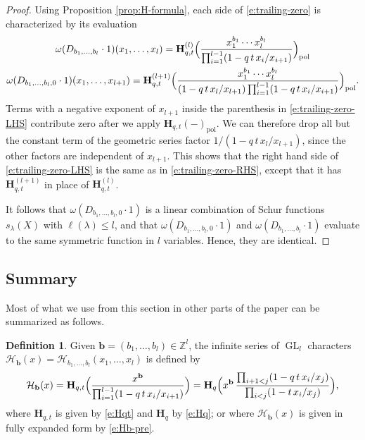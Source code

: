 \documentclass[12pt]{amsart}
\theoremstyle{definition}
\newtheorem{defn}[thm]{Definition}
\theoremstyle{remark}
\newcommand{\ZZ}{{\mathbb Z}}
\newcommand{\bb}{{\mathbf b}}
\newcommand{\Hbold}{{\mathbf H}}
\newcommand{\Hcat}{{\mathcal H}}  %
\DeclareMathOperator{\pol}{pol}
\DeclareMathOperator{\GL}{GL}
\begin{document}
\begin{proof}
Using Proposition \ref{prop:H-formula}, each side of
\eqref{e:trailing-zero} is characterized by its evaluation
\begin{gather}\label{e:trailing-zero-RHS}
\omega (D_{b_{1},\ldots,b_{l}} \cdot 1)(x_{1},\ldots,x_{l}) = \Hbold
^{(l)}_{q,t}\Bigl(\frac{x_{1}^{b_{1}}\cdots x_{l}^{b_{l}}}{\prod
_{i=1}^{l-1}(1 - q\, t\, x_{i}/x_{i+1})}\Bigr)_{\pol }\\
\label{e:trailing-zero-LHS}
\omega (D_{b_{1},\ldots,b_{l},0} \cdot 1)(x_{1},\ldots,x_{l+1}) =
\Hbold ^{(l+1)}_{q,t}\Bigl(\frac{x_{1}^{b_{1}}\cdots x_{l}^{b_{l}}}{(1
- q\, t\, x_{l}/x_{l+1})\prod _{i=1}^{l-1}(1 - q\, t\,
x_{i}/x_{i+1})}\Bigr)_{\pol }.
\end{gather}
Terms with a negative exponent of $x_{l+1}$ inside the parenthesis in
\eqref{e:trailing-zero-LHS} contribute zero after we apply $\Hbold
_{q,t}(-)_{\pol }$. We can therefore drop all but the constant term of
the geometric series factor $1/(1 - q\, t\, x_{l}/x_{l+1})$, since the
other factors are independent of $x_{l+1}$.  This shows that the right
hand side of \eqref{e:trailing-zero-LHS} is the same as in
\eqref{e:trailing-zero-RHS}, except that it has $\Hbold
^{(l+1)}_{q,t}$ in place of $\Hbold ^{(l)}_{q,t}$.  

It follows that $\omega (D_{b_{1},\ldots,b_{l},0} \cdot 1)$ is a
linear combination of Schur functions $s_{\lambda }(X)$ with
$\ell(\lambda )\leq l$, and that $\omega (D_{b_{1},\ldots,b_{l},0} \cdot
1)$ and $\omega (D_{b_{1},\ldots,b_{l}} \cdot 1)$ evaluate to the same
symmetric function in $l$ variables. Hence, they are identical.
\end{proof}


\subsection{Summary}
\label{ss:schiffmann-summary}

Most of what we use from this section in other parts of the paper can
be summarized as follows.

\begin{defn}\label{def:negut-catalanimal} Given $\bb =
(b_{1},\ldots,b_{l})\in \ZZ ^{l}$, the infinite series of $\GL _{l}$
characters $\Hcat _{\bb }(x) = \Hcat
_{b_{1},\ldots,b_{l}}(x_{1},\ldots,x_{l})$ is defined by
\begin{equation}\label{e:Hb}
\Hcat _{\bb }(x) = \Hbold _{q,t}\Bigl(\frac{x^{\bb }}{\prod
_{i=1}^{l-1}(1-q\, t\, x_{i}/x_{i+1})}\Bigr) = \Hbold _{q}\Bigl(
x^{\bb }\, \frac{\prod _{i+1<j}(1-q\, t\, x_{i}/x_{j})}{\prod
_{i<j}(1-t\, x_{i}/x_{j})} \Bigr),
\end{equation}
where $\Hbold _{q,t}$ is given by \eqref{e:Hqt} and $\Hbold _{q}$ by
\eqref{e:Hq}; or where $\Hcat _{\bb }(x)$ is given in fully expanded
form by \eqref{e:Hb-pre}.
\end{defn}
\end{document}
